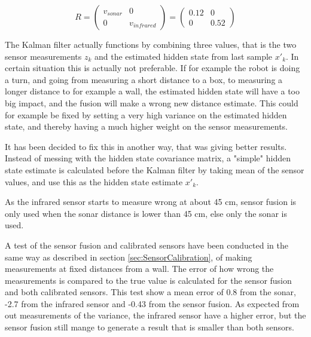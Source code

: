 \begin{equation}
\label{eq:R_matrix}
R = 
\begin{pmatrix}
v_{sonar} & 0 \\
0       & v_{infrared}
\end{pmatrix}
=
\begin{pmatrix}
0.12 & 0 \\
0       & 0.52
\end{pmatrix}
\end{equation}

The Kalman filter actually functions by combining three values, that is the two sensor measurements ${z}_{k}$ and the estimated hidden state from last sample ${x}'_{k}$.
In certain situation this is actually not preferable.
If for example the robot is doing a turn, and going from measuring a short distance to a box, to measuring a longer distance to for example a wall, the estimated hidden state will have a too big impact, and the fusion will make a wrong new distance estimate.
This could for example be fixed by setting a very high variance on the estimated hidden state, and thereby having a much higher weight on the sensor measurements.

It has been decided to fix this in another way, that was giving better results.
Instead of messing with the hidden state covariance matrix, a "simple" hidden state estimate is calculated before the Kalman filter by taking mean of the sensor values, and use this as the hidden state estimate ${x}'_{k}$.

As the infrared sensor starts to measure wrong at about 45 cm, sensor fusion is only used when the sonar distance is lower than 45 cm, else only the sonar is used.

A test of the sensor fusion and calibrated sensors have been conducted in the same way as described in section \ref{sec:SensorCalibration}, of making measurements at fixed distances from a wall.
The error of how wrong the measurements is compared to the true value is calculated for the sensor fusion and both calibrated sensors.
This test show a mean error of 0.8 from the sonar, -2.7 from the infrared sensor and -0.43 from the sensor fusion.
As expected from out measurements of the variance, the infrared sensor have a higher error, but the sensor fusion still mange to generate a result that is smaller than both sensors.

\pagebreak